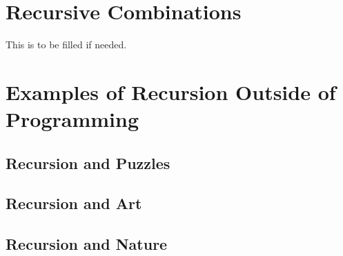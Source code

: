 \section{Recursive Combinations}
This is to be filled if needed.



\section{Examples of Recursion Outside of Programming}
\subsection{Recursion and Puzzles}



\subsection{Recursion and Art}

\subsection{Recursion and Nature}
